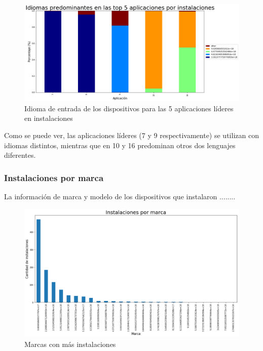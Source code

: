 \documentclass[a4paper, 12pt]{article}
\begin{document}
		\FloatBarrier
		\begin{figure}[h]
			\centering
			\includegraphics[width=\textwidth]{images/installs/idiomasapps.png}
			\caption{Idioma de entrada de los dispositivos para las 5 aplicaciones líderes en instalaciones}
		\end{figure}
		\FloatBarrier

		Como se puede ver, las aplicaciones líderes (7 y 9 respectivamente) se utilizan con idiomas distintos, mientras que en 10 y 16 predominan otros dos lenguajes diferentes.

	\subsubsection{Instalaciones por marca}

		La información de marca y modelo de los dispositivos que instalaron ........

		\FloatBarrier
		\begin{figure}[h]
			\centering
			\includegraphics[width=\textwidth]{images/installs/marcas.png}
			\caption{Marcas con más instalaciones}
		\end{figure}
		\FloatBarrier
\end{document}
